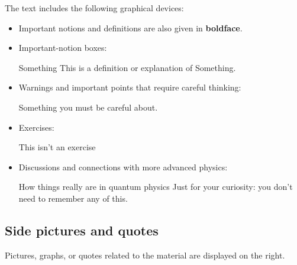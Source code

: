 \documentclass[a4paper,12pt,%
onecolumn,oneside,titlepage,%
british%
]{memoir}
\renewcommand*{\|}[1][]{\nonscript\:#1\vert\nonscript\:\mathopen{}}
\begin{document}
The text includes the following graphical devices:
\begin{itemize}[para]
\item Important notions and definitions are also given in \textbf{boldface}.

\item Important-notion boxes:
  \begin{definition}{Something}
    This is a definition or explanation of Something.
  \end{definition}
\item Warnings and important points that require careful thinking:
  \begin{warning}[Something]
    Something you must be careful about.
  \end{warning}
\item Exercises:
  \begin{exercise}
    This isn't an exercise
  \end{exercise}
\item Discussions and connections with more advanced physics:
  \begin{extra}{How things really are in quantum physics}
    Just for your curiosity: you don't need to remember any of this.
  \end{extra}
\end{itemize}

\subsection{\enspace Side pictures and quotes}

%
Pictures, graphs, or quotes related to the material are displayed on the right.
\end{document}
